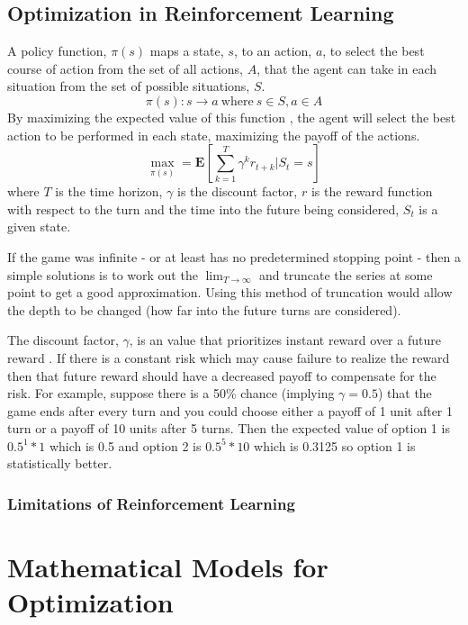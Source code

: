 \documentclass[10pt,a4paper]{report}
\begin{document}
		\section{Optimization in Reinforcement Learning}
			A policy function, $\pi(s)$ maps a state, $s$, to an action, $a$, to select the best course of action from the set of all actions, $A$, that the agent
			can take in each situation from the set of possible situations, $S$.
			\[\pi(s) : s \to a \ \text{where} \ s\in S, a \in A\]
			By maximizing the expected value of this function \autocite[p. 4]{SurveyOfOptimizationMethods}, the agent will select the
			best action to be performed in each state, maximizing the payoff of the actions.
			\begin{equation}
				\max_{\pi(s)} = \mathbf{E} \left[\sum_{k=1}^{T} \gamma^k r_{t+k} | S_t = s \right]
				\label{eq:reinforcement-learning}
			\end{equation}
			where $T$ is the time horizon, $\gamma$ is the discount factor, $r$ is the reward function with respect to the turn and
			the time into the future being considered, $S_t$ is a given state. \par
			If the game was infinite - or at least has no predetermined stopping point -
			then a simple solutions is to work out the $\lim_{T \to \infty}$ and truncate the series at some point to get a good approximation.
			Using this method of truncation would allow the depth to be changed (how far into the future turns are considered). \par
			The discount factor, $\gamma$, is an value that prioritizes instant reward over a future reward \autocite{sozou1998hyperbolic}.
			If there is a constant risk which may cause failure to realize the reward then that future reward should
			have a decreased payoff to compensate for the risk. For example, suppose there is a 50\% chance (implying $\gamma = 0.5$) that the game ends after every
			turn and you could choose either a payoff of 1 unit after 1 turn or a payoff of 10 units after 5 turns. Then the expected value of option 1 is
			$0.5^1 * 1$ which is 0.5 and option 2 is $0.5^5 * 10$ which is 0.3125 so option 1 is statistically better.

			\subsection{Limitations of Reinforcement Learning}



	\chapter{Mathematical Models for Optimization}
\end{document}
